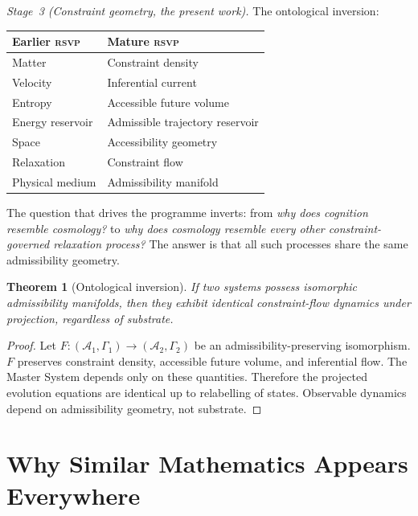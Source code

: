 \documentclass[12pt, oneside]{book}
\theoremstyle{plain}
\newtheorem{theorem}{Theorem}[chapter]
\theoremstyle{definition}
\newcommand{\RSVP}{\textsc{rsvp}}
\newcommand{\Adm}{\mathcal{A}}
\begin{document}
\textit{Stage~3 (Constraint geometry, the present work).} The ontological inversion:

\medskip
\noindent
\begin{center}
\begin{tabular}{ll}
\hline
\textbf{Earlier \RSVP} & \textbf{Mature \RSVP} \\
\hline
Matter           & Constraint density \\
Velocity         & Inferential current \\
Entropy          & Accessible future volume \\
Energy reservoir & Admissible trajectory reservoir \\
Space            & Accessibility geometry \\
Relaxation       & Constraint flow \\
Physical medium  & Admissibility manifold \\
\hline
\end{tabular}
\end{center}
\medskip

The question that drives the programme inverts: from \textit{why does cognition
resemble cosmology?} to \textit{why does cosmology resemble every other
constraint-governed relaxation process?} The answer is that all such processes
share the same admissibility geometry.

\begin{theorem}[Ontological inversion]
\label{thm:inversion}
If two systems possess isomorphic admissibility manifolds, then they exhibit
identical constraint-flow dynamics under projection, regardless of substrate.
\end{theorem}

\begin{proof}
Let $F: (\Adm_1, \Gamma_1) \to (\Adm_2, \Gamma_2)$ be an admissibility-preserving
isomorphism. $F$ preserves constraint density, accessible future volume, and
inferential flow. The Master System depends only on these quantities. Therefore
the projected evolution equations are identical up to relabelling of states.
Observable dynamics depend on admissibility geometry, not substrate.
\end{proof}

\chapter{Why Similar Mathematics Appears Everywhere}
\label{ch:why}
\end{document}
